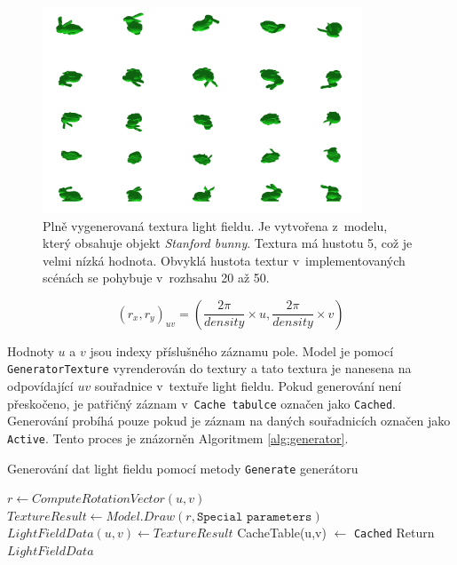 \begin{figure}[H]
	\centering
	\includegraphics[width=0.85\textwidth]{obrazky-figures/lightfield_texture.png}
	\caption{Plně vygenerovaná textura light fieldu. Je vytvořena z~modelu, který obsahuje objekt \emph{Stanford bunny}. Textura má hustotu 5, což je velmi nízká hodnota. Obvyklá hustota textur v~implementovaných scénách se pohybuje v~rozhsahu 20 až 50.   }
	\label{fig:lf_texture}
\end{figure}
\begin{equation}
\label{eq:rvector}
{(r_x,r_y)_{uv} = \left(\frac{2\pi}{density} \times u, \frac{2\pi}{density} \times v\right)}
\end{equation}

Hodnoty $u$ a $v$ jsou indexy příslušného záznamu pole. Model je pomocí \texttt{GeneratorTexture} vyrenderován do textury a tato textura je nanesena na odpovídající $uv$ souřadnice v~textuře light fieldu. Pokud generování není přeskočeno, je patřičný záznam v~\texttt{Cache tabulce} označen jako \texttt{Cached}. Generování probíhá pouze pokud je záznam na daných souřadnicích označen jako \texttt{Active}. Tento proces je znázorněn Algoritmem \ref{alg:generator}.

\begin{algorithm}[H]
\caption{Generování dat light fieldu pomocí metody
\label{alg:generator}
\texttt{Generate} generátoru}
\begin{algorithmic}
            \State $r \gets ComputeRotationVector(u,v)$ 
            \State $TextureResult \gets Model.Draw(r, \texttt{Special parameters})$
            \State $LightFieldData(u,v) \gets TextureResult$  
            \State CacheTable(u,v) $\gets$ \texttt{Cached}
        \EndIf
    \EndFor
\EndFor
\State Return $LightFieldData$
\EndProcedure
\end{algorithmic}
\end{algorithm}

